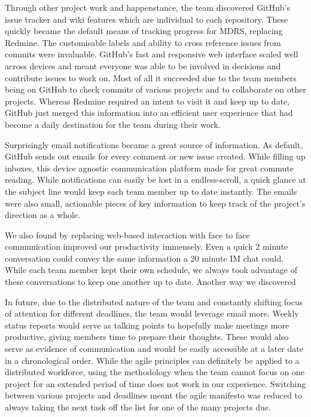 \documentclass{l3proj}
\begin{document}
Through other project work and happenstance, the team discovered GitHub's issue tracker and wiki features which are individual to each repository. These quickly became the default means of tracking progress for MDRS, replacing Redmine. The customisable labels and ability to cross reference issues from commits were invaluable. GitHub's fast and responsive web interface scaled well across devices and meant everyone was able to be involved in decisions and contribute issues to work on. Most of all it succeeded due to the team members being on GitHub to check commits of various projects and to collaborate on other projects. Whereas Redmine required an intent to visit it and keep up to date, GitHub just merged this information into an efficient user experience that had become a daily destination for the team during their work.

Surprisingly email notifications became a great source of information. As default, GitHub sends out emails for every comment or new issue created. While filling up inboxes, this device agnostic communication platform made for great commute reading. While notifications can easily be lost in a endless-scroll, a quick glance at the subject line would keep each team member up to date instantly. The emails were also small, actionable pieces of key information to keep track of the project's direction as a whole.

We also found by replacing web-based interaction with face to face communication improved our productivity immensely. Even a quick 2 minute conversation could convey the same information a 20 minute IM chat could. While each team member kept their own schedule, we always took advantage of these conversations to keep one another up to date. Another way we discovered

In future, due to the distributed nature of the team and constantly shifting
focus of attention for different deadlines, the team would leverage email more.
Weekly status reports would serve as talking points to hopefully make meetings
more productive, giving members time to prepare their thoughts. These would also
serve as evidence of communication and would be easily accessible at a later
date in a chronological order. While the agile principles can definitely be applied to a distributed workforce, using the methodology when the team cannot focus on one project for an extended period of time does not work in our experience. Switching between various projects and deadlines meant the agile manifesto was reduced to always taking the next task off the list for one of the many projects due.
\end{document}
